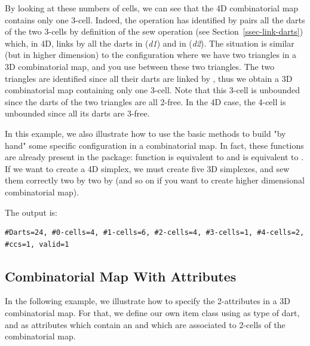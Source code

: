 By looking at these numbers of cells, we can see that the 4D
combinatorial map contains only one 3-cell. Indeed, the 
operation has identified by pairs all the darts of the two 3-cells
by definition of the sew operation (see Section~\ref{ssec-link-darts})
which, in 4D, links by \betatrois{} all the darts in
\orbit{\betaun{},\betadeux{}}(\emph{d1}) and in 
\orbit{\betaun{},\betadeux{}}(\emph{d2}).  The
situation is similar (but in higher dimension) to the
configuration where we have two triangles in a 3D combinatorial map,
and you use  between these two triangles. The two triangles
are identified since all their darts are linked by \betatrois{}, thus we
obtain a 3D combinatorial map containing only one 3-cell. Note that
this 3-cell is unbounded since the darts of the two triangles are all
2-free. In the 4D case, the 4-cell is unbounded since all its darts
are 3-free.

In this example, we also illustrate how to use the basic methods to
build "by hand" some specific configuration in a combinatorial
map. In fact, these functions are already present in the package:
function  is equivalent to
 and
 is equivalent to
.  If we want to create a 4D
simplex, we must create five 3D simplexes, and sew them correctly
two by two by \betatrois{} (and so on if you want to create higher
dimensional combinatorial map).


The output is:
\begin{verbatim}
#Darts=24, #0-cells=4, #1-cells=6, #2-cells=4, #3-cells=1, #4-cells=2, #ccs=1, valid=1
\end{verbatim}

\subsection{Combinatorial Map With Attributes}
\label{ssec-combi-map-with-color}

In the following example, we illustrate how to specify the
2-attributes in a 3D combinatorial map. For that, we define our own
item class using  as type of dart, and
as attributes which contain an  and which are associated to
2-cells of the combinatorial map.

